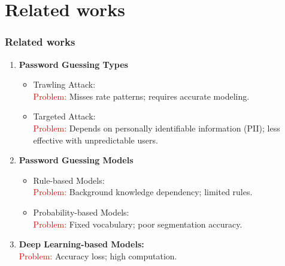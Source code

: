 \documentclass[
	12pt, %
]{beamer}
\begin{document}
\section{Related works}
\begin{frame}
	\frametitle{Related works}
	
	\begin{enumerate}
		\item \textbf{Password Guessing Types}
		\begin{itemize}
			\item Trawling Attack:\\
			\textcolor{red}{Problem:} Misses rate patterns; requires accurate modeling.
			
			\item Targeted Attack:\\
			\textcolor{red}{Problem:} Depends on personally identifiable information (PII); less effective with unpredictable users.
		\end{itemize}
		
		
		\item \textbf{Password Guessing Models}
		\begin{itemize}
			\item Rule-based Models:\\
			\textcolor{red}{Problem:} Background knowledge dependency; limited rules.
			
			\item Probability-based Models:\\
			\textcolor{red}{Problem:} Fixed vocabulary; poor segmentation accuracy.
		\end{itemize}
		
		
		\item \textbf{Deep Learning-based Models:}\\
		\textcolor{red}{Problem:} Accuracy loss; high computation.
		
	\end{enumerate}
\end{frame}



\end{document}
